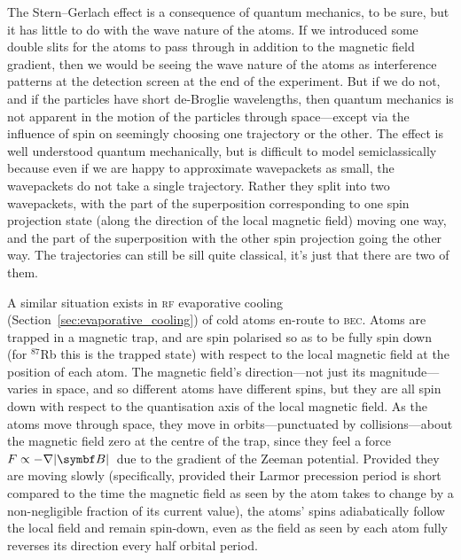 The Stern--Gerlach effect is a consequence of quantum mechanics, to be sure, but it has little to do with the wave nature of the atoms. If we introduced some double slits for the atoms to pass through in addition to the magnetic field gradient, then we would be seeing the wave nature of the atoms as interference patterns at the detection screen at the end of the experiment. But if we do not, and if the particles have short de-Broglie wavelengths, then quantum mechanics is not apparent in the motion of the particles through space---except via the influence of spin on seemingly choosing one trajectory or the other. The effect is well understood quantum mechanically, but is difficult to model semiclassically because even if we are happy to approximate wavepackets as small, the wavepackets do not take a single trajectory. Rather they split into two wavepackets, with the part of the superposition corresponding to one spin projection state (along the direction of the local magnetic field) moving one way, and the part of the superposition with the other spin projection going the other way. The trajectories can still be sill quite classical, it's just that there are two of them.

A similar situation exists in \textsc{rf} evaporative cooling (Section~\ref{sec:evaporative_cooling}) of cold atoms en-route to \textsc{bec}. Atoms are trapped in a magnetic trap, and are spin polarised so as to be fully spin down (for $^{87}$Rb this is the trapped state) with respect to the local magnetic field at the position of each atom. The magnetic field's direction---not just  its magnitude---varies in space, and so different atoms have different spins, but they are all spin down with respect to the quantisation axis of the local magnetic field. As the atoms move through space, they move in orbits---punctuated by collisions---about the magnetic field zero at the centre of the trap, since they feel a force $F\propto-\nabla\abs{\vec B}$ due to the gradient of the Zeeman potential. Provided they are moving slowly (specifically, provided their Larmor precession period is short compared to the time the magnetic field as seen by the atom takes to change by a non-negligible fraction of its current value), the atoms' spins adiabatically follow the local field and remain spin-down, even as the field as seen by each atom fully reverses its direction every half orbital period.

